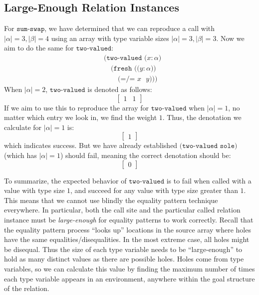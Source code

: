 \documentclass{report}
\theoremstyle{definition}
\begin{document}
\subsection{Large-Enough Relation Instances}

For \(\texttt{sum-swap}\), we have determined that we can reproduce a call with \(|\alpha| = 3, |\beta| = 4\) using an array with type variable sizes \(|\alpha| = 3, |\beta| = 3\).
Now we aim to do the same for \(\texttt{two-valued}\):
\begin{equation}
\begin{aligned}
	& \texttt{(two-valued (\(x : \alpha\))} \\
	& \quad \texttt{(fresh ((\(y : \alpha\)))} \\
	& \quad \quad \texttt{(=/= \(x\) \(y\))))}
\end{aligned}
\end{equation}
When \(|\alpha| = 2\), \(\texttt{two-valued}\) is denoted as follows:
\begin{equation}
	\begin{bmatrix} 1 & 1 \end{bmatrix} 
\end{equation}
If we aim to use this to reproduce the array for \(\texttt{two-valued}\) when \(|\alpha| = 1\), no matter which entry we look in, we find the weight \(1\).
Thus, the denotation we calculate for \(|\alpha| = 1\) is:
\begin{equation}
	\begin{bmatrix} 1 \end{bmatrix} 
\end{equation}
which indicates success.
But we have already established \(\texttt{(two-valued sole)}\) (which has \(|\alpha| = 1\)) should fail, meaning the correct denotation should be:
\begin{equation}
	\begin{bmatrix} 0 \end{bmatrix} 
\end{equation}

To summarize, the expected behavior of \(\texttt{two-valued}\) is to fail when called with a value with type size \(1\), and succeed for any value with type size greater than \(1\).
This means that we cannot use blindly the equality pattern technique everywhere.
In particular, both the call site and the particular called relation instance must be \emph{large-enough} for equality patterns to work correctly.
Recall that the equality pattern process ``looks up'' locations in the source array where holes have the same equalities/disequalities.
In the most extreme case, all holes might be disequal.
Thus the size of each type variable needs to be ``large-enough'' to hold as many distinct values as there are possible holes.
Holes come from type variables, so we can calculate this value by finding the maximum number of times each type variable appears in an environment,
anywhere within the goal structure of the relation.
\end{document}
